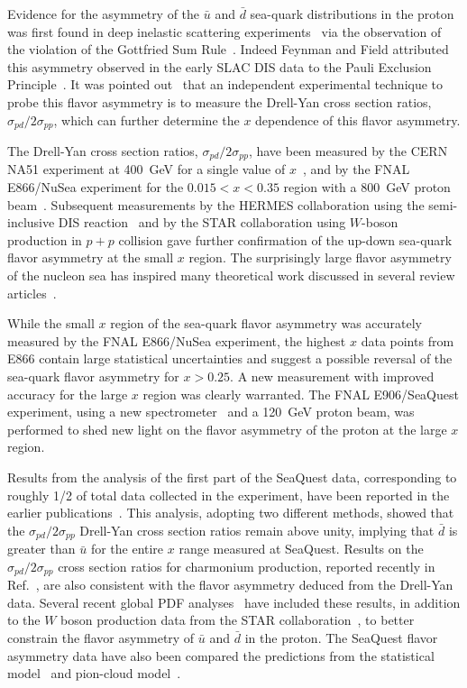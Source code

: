 \documentclass[reprint,aps,unsortedaddress,superscriptaddress,prl,floatfix,showpacs,linenumbers,final]{revtex4-2}
\begin{document}
Evidence for the asymmetry of the $\bar{u}$ and $\bar{d}$ sea-quark
distributions in the proton was first found in
deep inelastic scattering experiments~\cite{stein1975,amaudruz1991} via
the observation of the violation
of the Gottfried Sum Rule~\cite{gottfried1967}. Indeed Feynman and Field
attributed this asymmetry observed in the early SLAC DIS data to the Pauli
Exclusion Principle~\cite{field1977}. It was pointed out~\cite{ellis1991}
that an independent experimental technique to probe this flavor asymmetry is
to measure the Drell-Yan cross section ratios,
$\sigma_{pd}/2\sigma_{pp}$, which can further determine the $x$ dependence
of this flavor asymmetry.

The Drell-Yan cross section ratios,
$\sigma_{pd}/2\sigma_{pp}$, have been measured by the CERN NA51 experiment at
\SI{400}{\GeV} for a single value of $x$~\cite{NA51:1994xrz}, and by the FNAL
E866/NuSea experiment for the $0.015 < x < 0.35$ region with a \SI{800}{\GeV}
proton beam~\cite{hawker1998,peng1998,towell2001}. Subsequent measurements by the
HERMES collaboration using the semi-inclusive DIS reaction~\cite{ackerstaff1998}
and by the STAR collaboration using $W$-boson production in $p+p$ collision
gave further confirmation of the up-down sea-quark flavor asymmetry at
the small $x$ region. The surprisingly large flavor asymmetry of the nucleon
sea has inspired many theoretical work discussed in several review
articles~\cite{kumano1998,vogt2000a,garvey2001,chang2014}. 

While the small $x$ region of the sea-quark flavor asymmetry was accurately
measured by the FNAL E866/NuSea experiment, the highest $x$ data points from
E866 contain large statistical uncertainties and suggest a possible reversal of
the sea-quark flavor asymmetry for $x > 0.25$. A new measurement with improved
accuracy for the large $x$ region was clearly warranted. The FNAL
E906/SeaQuest experiment, using a new spectrometer~\cite{aidala2019} and
a \SI{120}{\GeV} proton beam, was performed to shed new light on the flavor asymmetry
of the proton at the large $x$ region.

Results from the analysis of the first part of the SeaQuest data, corresponding
to roughly 1/2 of total data collected in the experiment, have been reported
in the earlier publications~\cite{dove2021,dove2023}.
This analysis, adopting two different methods, showed that the
$\sigma_{pd}/2\sigma_{pp}$ Drell-Yan cross section ratios remain
above unity, implying that
$\bar{d}$ is greater than $\bar{u}$ for the entire $x$ range measured
at SeaQuest. Results on the $\sigma_{pd}/2\sigma_{pp}$  cross section ratios
for charmonium production, reported recently in
Ref.~\cite{leung2024a}, are also consistent with the flavor asymmetry
deduced from the Drell-Yan data.
Several recent global PDF
analyses~\cite{cocuzza2021,ball2022a,accardi2023,alekhin2023}
have included these results, in addition to the $W$ boson production data
from the STAR collaboration~\cite{adam2021}, to better constrain the
flavor asymmetry of $\bar u$ and $\bar d$ in the proton. The SeaQuest
flavor asymmetry data have also been compared the predictions from the
statistical model~\cite{soffer2019} and pion-cloud model~\cite{alberg2022}.
\end{document}

